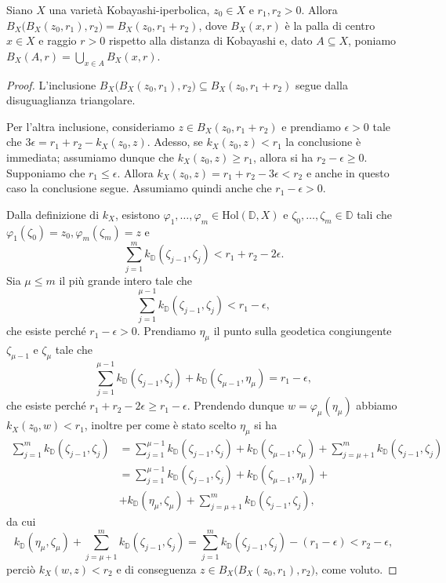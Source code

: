 \begin{lm} \label{ballball}
    Siano $X$ una varietà Kobayashi-iperbolica, $z_0 \in X$ e $r_1,r_2>0$. Allora $B_X\big(B_X(z_0,r_1),r_2\big)=B_X(z_0,r_1+r_2)$, dove $B_X(x,r)$ è la palla di centro $x \in X$ e raggio $r>0$ rispetto alla distanza di Kobayashi e, dato $A\subseteq X$, poniamo $B_X(A,r)=\displaystyle\bigcup_{x \in A}B_X(x,r)$.
\end{lm}
\begin{proof}
    L'inclusione $B_X\big(B_X(z_0,r_1),r_2\big)\subseteq B_X(z_0,r_1+r_2)$ segue dalla disuguaglianza triangolare.

    Per l'altra inclusione, consideriamo $z \in B_X(z_0,r_1+r_2)$ e prendiamo $\epsilon>0$ tale che $3\epsilon=r_1+r_2-k_X(z_0,z)$. Adesso, se $k_X(z_0,z)<r_1$ la conclusione è immediata; assumiamo dunque che $k_X(z_0,z)\ge r_1$, allora si ha $r_2-\epsilon \ge 0$. Supponiamo che $r_1 \le \epsilon$. Allora $k_X(z_0,z)=r_1+r_2-3\epsilon<r_2$ e anche in questo caso la conclusione segue. Assumiamo quindi anche che $r_1-\epsilon>0$.

    Dalla definizione di $k_X$, esistono $\varphi_1,\dots,\varphi_m \in \text{Hol}(\mathbb{D},X)$ e $\zeta_0,\dots,\zeta_m \in \mathbb{D}$ tali che $\varphi_1(\zeta_0)=z_0, \varphi_m(\zeta_m)=z$ e
    $$\sum_{j=1}^m k_{\mathbb{D}}(\zeta_{j-1},\zeta_j)<r_1+r_2-2\epsilon.$$
    Sia $\mu \le m$ il più grande intero tale che
    $$\sum_{j=1}^{\mu-1} k_{\mathbb{D}}(\zeta_{j-1},\zeta_j)<r_1-\epsilon,$$
    che esiste perché $r_1-\epsilon>0$. Prendiamo $\eta_{\mu}$ il punto sulla geodetica congiungente $\zeta_{\mu-1}$ e $\zeta_{\mu}$ tale che
    $$\sum_{j=1}^{\mu-1} k_{\mathbb{D}}(\zeta_{j-1},\zeta_j)+k_{\mathbb{D}}(\zeta_{\mu-1},\eta_{\mu})=r_1-\epsilon,$$
    che esiste perché $r_1+r_2-2\epsilon \ge r_1-\epsilon$. Prendendo dunque $w=\varphi_{\mu}(\eta_{\mu})$ abbiamo $k_X(z_0,w)<r_1$, inoltre per come è stato scelto $\eta_{\mu}$ si ha
    \begin{align*}
        \sum_{j=1}^m k_{\mathbb{D}}(\zeta_{j-1},\zeta_j)&=\sum_{j=1}^{\mu-1} k_{\mathbb{D}}(\zeta_{j-1},\zeta_j)+k_{\mathbb{D}}(\zeta_{\mu-1},\zeta_{\mu})+\sum_{j=\mu+1}^m k_{\mathbb{D}}(\zeta_{j-1},\zeta_j)\\
        &=\sum_{j=1}^{\mu-1} k_{\mathbb{D}}(\zeta_{j-1},\zeta_j)+k_{\mathbb{D}}(\zeta_{\mu-1},\eta_{\mu})+\\
        &+k_{\mathbb{D}}(\eta_{\mu},\zeta_{\mu})+\sum_{j=\mu+1}^m k_{\mathbb{D}}(\zeta_{j-1},\zeta_j),
    \end{align*}
    da cui
    $$k_{\mathbb{D}}(\eta_{\mu},\zeta_{\mu})+\sum_{j=\mu+1}^m k_{\mathbb{D}}(\zeta_{j-1},\zeta_j)=\sum_{j=1}^m k_{\mathbb{D}}(\zeta_{j-1},\zeta_j)-(r_1-\epsilon)<r_2-\epsilon,$$
    perciò $k_X(w,z)<r_2$ e di conseguenza $z \in B_X\big(B_X(z_0,r_1),r_2\big)$, come voluto.
\end{proof}

